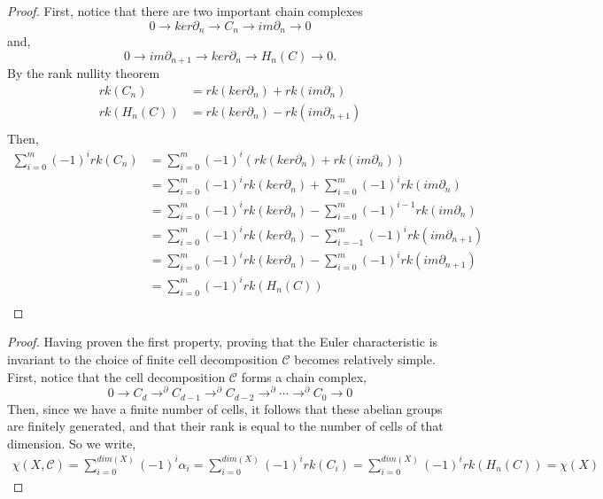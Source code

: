 \documentclass{article}
\theoremstyle{definition}
\begin{document}
    \begin{proof}
    First, notice that there are two important chain complexes
    \[
    0\to ker\partial_n \to C_n \to im\partial_n \to 0
    \] 
    and,
    \[
    0\to im\partial_{n+1}\to ker\partial_n \to H_n(C)\to 0
    .\] 
    By the rank nullity theorem
    \begin{align*}
        rk(C_n) &= rk(ker\partial_n) + rk(im\partial_n) \\
        rk(H_n(C)) &= rk(ker\partial_n) - rk(im\partial_{n+1}) \\
    \end{align*}
    Then,
    \begin{align*}
        \sum_{i=0}^{m} (-1)^i rk(C_n) &= \sum_{i=0}^{m} (-1)^i \left(rk(ker\partial_n) + rk(im\partial_n)\right) \\
        &= \sum_{i=0}^{m} (-1)^i rk(ker\partial_n) + \sum_{i=0}^{m} (-1)^i rk(im\partial_n) \\
        &= \sum_{i=0}^{m} (-1)^i rk(ker\partial_n) - \sum_{i=0}^{m} (-1)^{i-1} rk(im\partial_n) \\
        &= \sum_{i=0}^{m} (-1)^i rk(ker\partial_n) - \sum_{i=-1}^{m} (-1)^{i} rk(im\partial_{n+1}) \\
        &= \sum_{i=0}^{m} (-1)^i rk(ker\partial_n) - \sum_{i=0}^{m} (-1)^{i} rk(im\partial_{n+1}) \\
        &= \sum_{i=0}^{m} (-1)^i rk(H_n(C)) \\
    \end{align*}
    \end{proof}
    \begin{proof}
        Having proven the first property, proving that the Euler characteristic is invariant to 
        the choice of finite cell decomposition $\mathcal{C}$ becomes relatively simple.
        First, notice that the cell decomposition $\mathcal{C}$ forms a chain complex,
        \[
            0\to C_d \to^\partial C_{d-1} \to^\partial  C_{d-2} \to^\partial \cdots \to^\partial C_0 \to 0
        \] 
        Then, since we have a finite number of cells, it follows that these abelian groups are
        finitely generated, and that their rank is equal to the number of cells of that dimension.
        So we write,
        \begin{align*}
            \chi(X,\mathcal{C}) = \sum_{i=0}^{dim(X)} (-1)^i \alpha_i = \sum_{i=0}^{dim(X)} (-1)^i rk(C_i) = \sum_{i=0}^{dim(X)} (-1)^i rk(H_n(C)) = \chi(X)
        \end{align*}
    \end{proof}
\pagebreak
\end{document}
